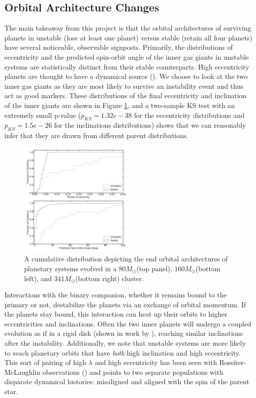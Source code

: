 \documentclass{aastex631}
\begin{document}
\subsection{Orbital Architecture Changes}
The main takeaway from this project is that the orbital architectures of surviving planets in unstable (lose at least one planet)
 versus stable (retain all four planets) have several noticeable, observable signposts. 
 Primarily, the distributions of eccentricity and the predicted spin-orbit angle of the inner gas giants in 
 unstable systems are statistically distinct from their stable counterparts. High eccentricity planets are thought to have a dynamical source (\cite{dlfm97}).
  We choose to look at the 
 two inner gas giants as they are most likely to survive an instability event and thus act as good markers.
These distributions of the final eccentricity and inclination of the inner giants are shown in Figure \ref{fig:160_ecc_inc}, 
 and a two-sample KS test with an extremely small p-value ($p_{KS} = 1.32e-38$ for the eccentricity distributions
 and $p_{KS} = 1.5e-26$ for the inclinations distributions) shows that we can reasonably infer that they are drawn from different parent distributions. 
\begin{figure}[h!]
    \centering
    \includegraphics[width=0.5\textwidth]{fig/cumulative_ecc_inc_bigfont80.png}
    
    \caption{A cumulative distribution depicting the end orbital architectures of planetary systems evolved in a $80M_{\odot}$(top panel), $160M_{\odot}$(bottom left), 
    and $341M_{\odot}$(bottom right) cluster.}
    \label{fig:160_ecc_inc}
\end{figure}
Interactions with the binary companion, whether it remains bound to the primary or not, destabilize the planets via an exchange of orbital 
momentum. If the planets stay bound, this interaction can heat up their orbits to higher eccentricities and inclinations. Often the two
inner planets will undergo a coupled evolution as if in a rigid disk (shown in work by \cite{ina97}), reaching similar inclinations after the instability. 
Additionally, we note that unstable systems are more likely to reach planetary orbits that have \textit{both} high inclination and high eccentricity. This 
sort of pairing of high $\lambda$ and high eccentricity has been seen with Rossiter-McLaughlin observations
(\cite{sch10}) and points to two separate populations with disparate dynamical histories: misaligned and aligned with the 
spin of the parent star.
\end{document}
